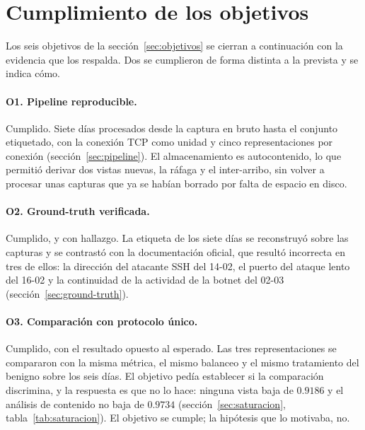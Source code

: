 %

\section{Cumplimiento de los objetivos}
\label{sec:objetivos-cumplidos}

Los seis objetivos de la sección~\ref{sec:objetivos} se cierran a continuación
con la evidencia que los respalda. Dos se cumplieron de forma distinta a la
prevista y se indica cómo.

\paragraph{O1. Pipeline reproducible.} Cumplido. Siete días procesados desde la
captura en bruto hasta el conjunto etiquetado, con la conexión TCP como unidad y
cinco representaciones por conexión (sección~\ref{sec:pipeline}). El
almacenamiento es autocontenido, lo que permitió derivar dos vistas nuevas, la
ráfaga y el inter-arribo, sin volver a procesar unas capturas que ya se habían
borrado por falta de espacio en disco.

\paragraph{O2. Ground-truth verificada.} Cumplido, y con hallazgo. La etiqueta
de los siete días se reconstruyó sobre las capturas y se contrastó con la
documentación oficial, que resultó incorrecta en tres de ellos: la dirección del
atacante SSH del 14-02, el puerto del ataque lento del 16-02 y la continuidad de
la actividad de la botnet del 02-03 (sección~\ref{sec:ground-truth}).

\paragraph{O3. Comparación con protocolo único.} Cumplido, con el resultado
opuesto al esperado. Las tres representaciones se compararon con la misma
métrica, el mismo balanceo y el mismo tratamiento del benigno sobre los seis
días. El objetivo pedía establecer si la comparación discrimina, y la respuesta
es que no lo hace: ninguna vista baja de $0.9186$ y el análisis de contenido no
baja de $0.9734$ (sección~\ref{sec:saturacion},
tabla~\ref{tab:saturacion}). El objetivo se cumple; la hipótesis que lo motivaba,
no.

